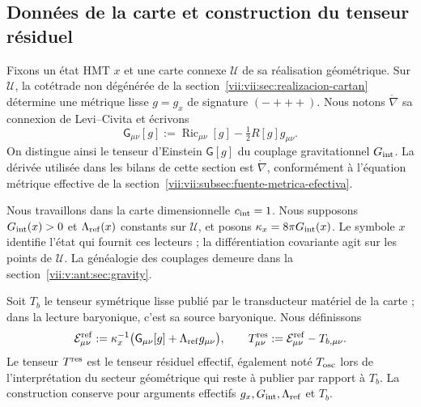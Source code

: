 \subsection{Données de la carte et construction du tenseur résiduel}
\label{vii:vii:subsec:datos-tensor-residual}

Fixons un état HMT \(x\) et une carte connexe \(\mathcal U\) de sa
réalisation géométrique. Sur \(\mathcal U\), la cotétrade non dégénérée
de la section~\ref{vii:vii:sec:realizacion-cartan} détermine une métrique lisse
\(g=g_x\) de signature \((-+++)\). Nous notons
\(\mathring\nabla\) sa connexion de Levi--Civita et écrivons
\[
 \mathsf G_{\mu\nu}[g]
 :=\operatorname{Ric}_{\mu\nu}[g]-\tfrac12R[g]g_{\mu\nu}.
\]
On distingue ainsi le tenseur d'Einstein \(\mathsf G[g]\) du couplage
gravitationnel \(G_{\rm int}\). La dérivée utilisée dans les bilans
de cette section est \(\mathring\nabla\), conformément à l'équation
métrique effective de la section~\ref{vii:vii:subsec:fuente-metrica-efectiva}.

Nous travaillons dans la carte dimensionnelle \(c_{\rm int}=1\). Nous supposons \(G_{\rm int}(x)>0\) et \(\Lambda_{\rm ref}(x)\) constants sur \(\mathcal U\), et posons \(\kappa_x=8\pi G_{\rm int}(x)\). Le symbole \(x\) identifie l'état qui fournit ces lecteurs ; la différentiation covariante agit sur les points de \(\mathcal U\). La généalogie des couplages demeure dans la section~\ref{vii:v:ant:sec:gravity}.

Soit \(T_b\) le tenseur symétrique lisse publié par le transducteur matériel
de la carte ; dans la lecture baryonique, c'est sa source baryonique. Nous définissons
\begin{equation}
 \mathcal E^{\rm ref}_{\mu\nu}
 :=\kappa_x^{-1}\bigl(\mathsf G_{\mu\nu}[g]
                            +\Lambda_{\rm ref}g_{\mu\nu}\bigr),
 \qquad
 T^{\rm res}_{\mu\nu}:=\mathcal E^{\rm ref}_{\mu\nu}-T_{b,\mu\nu}.
 \label{vii:vii:eq:residual-definicion}
\end{equation}
Le tenseur \(T^{\rm res}\) est le tenseur résiduel effectif, également
noté \(T_{\rm osc}\) lors de l'interprétation du secteur géométrique qui reste
à publier par rapport à \(T_b\). La construction conserve pour
arguments effectifs \(g_x,G_{\rm int},\Lambda_{\rm ref}\) et \(T_b\).

